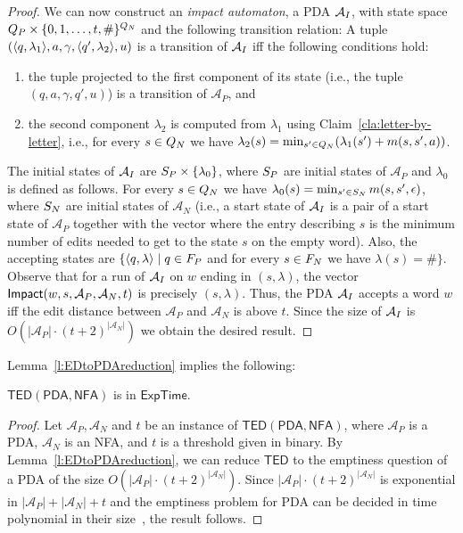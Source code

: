 \documentclass{CSML}
\newcommand{\aut}{\mathcal{A}}
\newcommand{\EXPTIME}{\textsf{ExpTime}}
\newcommand{\NFA}{\mathsf{NFA}}
\newcommand{\PDA}{\mathsf{PDA}}
\newcommand{\TED}{\mathsf{TED}}
\begin{document}
\begin{proof}
We can now construct an {\em impact automaton}, a PDA $\autImpact$,
with state space $Q_{P} \times \{0,1,\dots, t,\#\}^{Q_{N}}$ and the
following transition relation:
A tuple $(\langle q,\lambda_1 \rangle,a, \gamma, \langle q',\lambda_2 \rangle, u)$ is a transition of $\autImpact$ iff the following conditions hold:
\begin{enumerate}
\item the tuple projected to the first component of its state (i.e., the tuple $(q,a, \gamma, q', u)$) is a transition of $\aut_P$, and 
\item the second component $\lambda_2$ is computed from $\lambda_1$ using Claim~\ref{cla:letter-by-letter}, i.e.,
for every $s \in Q_{N}$ we have $\lambda_2(s) = \min_{s' \in Q_{N}} (\lambda_1(s')+m(s,s',a))$.
\end{enumerate}
The initial states of $\autImpact$ are $S_{P} \times \{ \lambda_0 \}$, where 
$S_{P}$ are initial states of $\aut_P$ and $\lambda_0$ is defined as follows.
For every $s \in Q_{N}$ we have $\lambda_0(s) = \min_{s'\in S_{N}} m(s,s',\epsilon)$, where $S_{N}$ are initial states of $\aut_N$
(i.e.,  a start state of $\autImpact$ is a pair of a start state of $\aut_P$ together with the vector where the entry describing $s$ is the minimum number of edits needed to get to the state $s$ on the empty word). 
Also, the accepting states are $\{ \langle q,\lambda \rangle \mid q\in F_{P}$ and for every $s \in F_{N}$ we have $\lambda(s) =\# \}$. 
Observe that for a run of $\autImpact$ on $w$ ending in $(s,\lambda)$, the vector $\Impact(w,s,\aut_P,\aut_N,t)$ is precisely $(s,\lambda)$.
Thus, the PDA $\autImpact$ accepts a word $w$ iff the edit distance between 
$\aut_P$ and $\aut_N$ is above $t$. 
Since the size of $\autImpact$ is $O(|\aut_P|\cdot (t+2)^{|\aut_N|})$ we obtain 
the desired  result.
\end{proof}


Lemma~\ref{l:EDtoPDAreduction} implies the following:

\begin{lem}\label{l:TEDinexp}
$\TED(\PDA, \NFA)$ is in $\EXPTIME$.
\end{lem}
\begin{proof}
Let $\aut_P, \aut_N$ and $t$ be an instance of $\TED(\PDA, \NFA)$, where
$\aut_P$ is a PDA, $\aut_N$ is an NFA, and $t$ is a threshold given in binary.
By Lemma~\ref{l:EDtoPDAreduction}, we can reduce $\TED$ to the emptiness question of 
a PDA of the size $O(|\aut_P|\cdot (t+2)^{|\aut_N|})$.
Since $|\aut_P|\cdot (t+2)^{|\aut_N|}$ is exponential in $|\aut_P| + |\aut_N| + t$ and
the emptiness problem for PDA can be decided in time polynomial in their size~\cite{HU79},
the result follows.
\end{proof}
\end{document}
